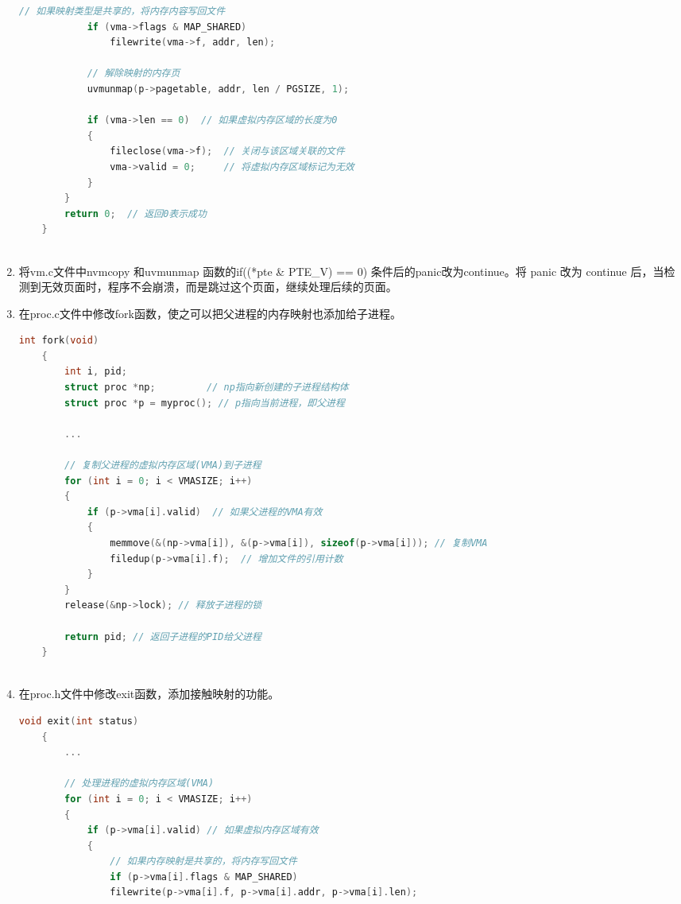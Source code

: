 \begin{enumerate}
\begin{lstlisting}[language=c,title=sys\_munmap的实现]
            // 如果映射类型是共享的，将内存内容写回文件
            if (vma->flags & MAP_SHARED)
                filewrite(vma->f, addr, len);
        
            // 解除映射的内存页
            uvmunmap(p->pagetable, addr, len / PGSIZE, 1);
        
            if (vma->len == 0)  // 如果虚拟内存区域的长度为0
            {
                fileclose(vma->f);  // 关闭与该区域关联的文件
                vma->valid = 0;     // 将虚拟内存区域标记为无效
            }
        }
        return 0;  // 返回0表示成功
    }
                
    \end{lstlisting}
    \item 将vm.c文件中nvmcopy 和uvmunmap 函数的if((*pte \& PTE\_V) == 0) 条件后的panic改为continue。将 panic 改为 continue 后，当检测到无效页面时，程序不会崩溃，而是跳过这个页面，继续处理后续的页面。
    \item 在proc.c文件中修改fork函数，使之可以把父进程的内存映射也添加给子进程。
          \begin{lstlisting}[language=c,title=对fork函数的修改]
    int fork(void)
    {
        int i, pid;
        struct proc *np;         // np指向新创建的子进程结构体
        struct proc *p = myproc(); // p指向当前进程，即父进程
    
        ...
    
        // 复制父进程的虚拟内存区域(VMA)到子进程
        for (int i = 0; i < VMASIZE; i++)
        {
            if (p->vma[i].valid)  // 如果父进程的VMA有效
            {
                memmove(&(np->vma[i]), &(p->vma[i]), sizeof(p->vma[i])); // 复制VMA
                filedup(p->vma[i].f);  // 增加文件的引用计数
            }
        }
        release(&np->lock); // 释放子进程的锁
    
        return pid; // 返回子进程的PID给父进程
    }
                
    \end{lstlisting}
    \item 在proc.h文件中修改exit函数，添加接触映射的功能。
          \begin{lstlisting}[language=c,title=对exit函数的修改]
    void exit(int status)
    {
        ...
    
        // 处理进程的虚拟内存区域(VMA)
        for (int i = 0; i < VMASIZE; i++)
        {
            if (p->vma[i].valid) // 如果虚拟内存区域有效
            {
                // 如果内存映射是共享的，将内存写回文件
                if (p->vma[i].flags & MAP_SHARED)
                filewrite(p->vma[i].f, p->vma[i].addr, p->vma[i].len);
                

\end{lstlisting}
\end{enumerate}
